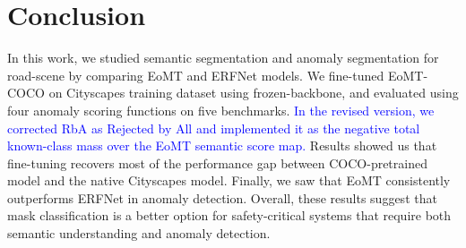 \section{Conclusion}
\label{sec:conclusion}

In this work, we studied semantic segmentation and anomaly segmentation for road-scene by comparing EoMT and ERFNet models.
We fine-tuned EoMT-COCO on Cityscapes training dataset using frozen-backbone, and evaluated using four anomaly scoring functions on five benchmarks.
\textcolor{blue}{In the revised version, we corrected RbA as Rejected by All and implemented it as the negative total known-class mass over the EoMT semantic score map.}
Results showed us that fine-tuning recovers most of the performance gap between COCO-pretrained model and the native Cityscapes model.
Finally, we saw that EoMT consistently outperforms ERFNet in anomaly detection. 
Overall, these results suggest that mask classification is a better option for safety-critical systems that require both semantic understanding and anomaly detection.
